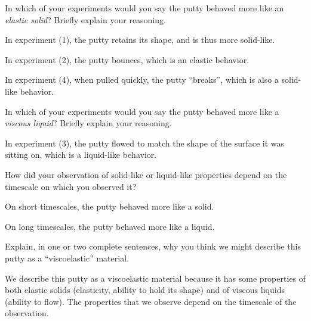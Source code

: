 \begin{activity}
\begin{model}
\end{model}


\begin{ctqs}

	\question In which of your experiments would you say the putty behaved more like an \emph{elastic solid}?  Briefly explain your reasoning.
	
		\begin{solution}[1.25in]
		
			In experiment (1), the putty retains its shape, and is thus more solid-like.  
			
			In experiment (2), the putty bounces, which is an elastic behavior.
			
			In experiment (4), when pulled quickly, the putty ``breaks'', which is also a solid-like behavior.
		
		\end{solution}
	
	\question In which of your experiments would you say the putty behaved more like a \emph{viscous liquid}?  Briefly explain your reasoning.
	
		\begin{solution}[1in]
		
			In experiment (3), the putty flowed to match the shape of the surface it was sitting on, which is a liquid-like behavior.
		
		\end{solution}
	
	\question How did your observation of solid-like or liquid-like properties depend on the timescale on which you observed it?
	
		\begin{solution}[1in]
		
			On short timescales, the putty behaved more like a solid.
			
			On long timescales, the putty behaved more like a liquid.
			
		\end{solution}
		
	\question Explain, in one or two complete sentences, why you think we might describe this putty as a ``viscoelastic'' material.
	
			\begin{solution}[2in]
			
				We describe this putty as a viscoelastic material because it  has some properties of both elastic solids (elasticity, ability to hold its shape) and of viscous liquids (ability to flow).  The properties that we observe depend on the timescale of the observation.
				

\end{solution}
\end{ctqs}
\end{activity}

